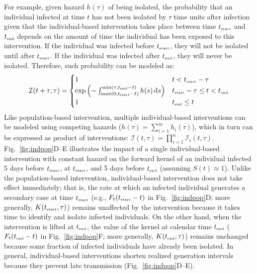 \documentclass[12pt]{article}
\newcommand{\fref}[1]{Fig.~\ref{fig:#1}}
\newcommand{\tsub}[2]{#1_{{\textrm{\tiny #2}}}}
\newcommand{\dd}[1]{\ensuremath{\, \mathrm{d}#1}}
\newcommand{\tstart}{\ensuremath{\tsub{t}{start}}\xspace}
\newcommand{\tend}{\ensuremath{\tsub{t}{end}}\xspace}
\newcommand{\II}{{\mathcal I}}
\begin{document}
For example, given hazard $h(\tau)$ of being isolated, the probability that an individual infected at time $t$ has not been isolated by $\tau$ time units after infection given that the individual-based intervention takes place between time \tstart and \tend depends on the amount of time the individual has been exposed to this intervention.
If the individual was infected before $\tstart$, they will not be isolated until after $\tstart$.
If the individual was infected after $\tend$, they will never be isolated.
Therefore, such probability can be modeled as:
\begin{equation}
\II(t+\tau, \tau) = \begin{cases}
1 & t < \tstart-\tau \\
\exp\left(- \int_{\max(0, \tstart - t)}^{\min(\tau, \tend-t)} h(s)\dd{s} \right) & \tstart-\tau \leq t < \tend \\
1 & \tend \leq t
\end{cases}
\end{equation}
Like population-based intervention, multiple individual-based interventions can be modeled using competing hazards ($h(\tau)=\sum_{i=1}^m h_i(\tau)$), which in turn can be expressed as product of interventions: $\II(t,\tau) = \prod_{i=1}^n \II_i(t,\tau)$.
\fref{indpop}D--E illustrates the impact of a single individual-based intervention with constant hazard on the forward kernel of an individual infected 5 days before $\tstart$, at $\tstart$, and 5 days before $\tend$ (assuming $S(t) \approx 1$).
Unlike the population-based intervention, individual-based intervention does not take effect immediately;
that is, the rate at which an infected individual generates a secondary case at time $\tstart$ (e.g., $F_t(\tstart-t)$ in \fref{indpop}D; more generally, $K(\tstart, \tau)$) remains unaffected by the intervention because it takes time to identify and isolate infected individuals.
On the other hand, when the intervention is lifted at $\tend$, the value of the kernel at calendar time $\tend$ ($F_t(\tend-t)$ in \fref{indpop}F; more generally, $K(\tend, \tau)$) remains unchanged because some fraction of infected individuals have already been isolated.
In general, individual-based interventions shorten realized generation intervals because they prevent late transmission (\fref{indpop}D--E).
\end{document}
